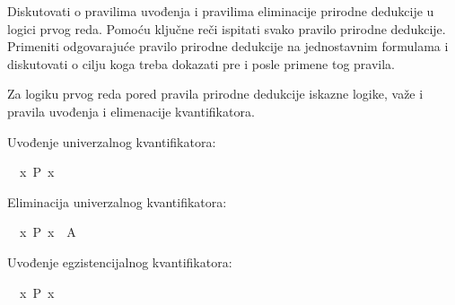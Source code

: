 %
\begin{isabellebody}%
%
%
\isadelimtheory
%
\endisadelimtheory
%
\isatagtheory
%
\endisatagtheory
{\isafoldtheory}%
%
\isadelimtheory
%
\endisadelimtheory
%
\begin{exercise}[subtitle=Intuicionistička pravila prirodne dedukcije u logici prvog reda]
%
\begin{isamarkuptext}%
Diskutovati o pravilima uvođenja i pravilima eliminacije prirodne dedukcije u logici 
      prvog reda. Pomoću ključne reči  ispitati svako pravilo prirodne dedukcije. 
      Primeniti odgovarajuće pravilo prirodne dedukcije na jednostavnim formulama i diskutovati 
      o cilju koga treba dokazati pre i posle primene tog pravila.%
\end{isamarkuptext}\isamarkuptrue%
%
\begin{isamarkuptext}%
Za logiku prvog reda pored pravila prirodne dedukcije iskazne 
      logike, važe i pravila uvođenja i elimenacije kvantifikatora.%
\end{isamarkuptext}\isamarkuptrue%
%
\begin{isamarkuptext}%
Uvođenje univerzalnog kvantifikatora: %
\end{isamarkuptext}\isamarkuptrue%
\isamarkupfalse%
\ {\isachardoublequoteopen}{\isasymforall}\ x{\isachardot}{\kern0pt}\ P\ x{\isachardoublequoteclose}\isanewline
\ \ %
\isadelimproof
%
\endisadelimproof
%
\isatagproof
%
\endisatagproof
{\isafoldproof}%
%
\isadelimproof
%
\endisadelimproof
%
\begin{isamarkuptext}%
Eliminacija univerzalnog kvantifikatora: %
\end{isamarkuptext}\isamarkuptrue%
\isamarkupfalse%
\ {\isachardoublequoteopen}{\isasymforall}\ x{\isachardot}{\kern0pt}\ P\ x\ {\isasymLongrightarrow}\ A{\isachardoublequoteclose}\isanewline
\ \ %
\isadelimproof
%
\endisadelimproof
%
\isatagproof
%
\endisatagproof
{\isafoldproof}%
%
\isadelimproof
%
\endisadelimproof
%
\begin{isamarkuptext}%
Uvođenje egzistencijalnog kvantifikatora: %
\end{isamarkuptext}\isamarkuptrue%
\isamarkupfalse%
\ {\isachardoublequoteopen}{\isasymexists}\ x{\isachardot}{\kern0pt}\ P\ x{\isachardoublequoteclose}\isanewline
\ \ %
\isadelimproof
%
\endisadelimproof
%
\isatagproof
%
\endisatagproof
{\isafoldproof}%
%
\isadelimproof
%
\endisadelimproof
%
\begin{isamarkuptext}%

\end{isamarkuptext}
\end{exercise}
\end{isabellebody}
